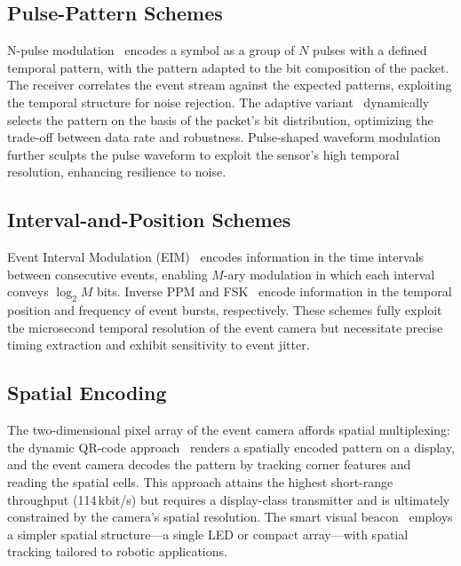 \documentclass[10pt,a4paper]{article}
\begin{document}
\subsection{Pulse-Pattern Schemes}
\label{sec:pulse}

N-pulse modulation~\cite{aranda2024npulse} encodes a symbol as a group
of $N$ pulses with a defined temporal pattern, with the pattern adapted
to the bit composition of the packet. The receiver correlates the event
stream against the expected patterns, exploiting the temporal structure
for noise rejection. The adaptive variant~\cite{nishar2025nlosneuromorphic}
dynamically selects the pattern on the basis of the packet's bit
distribution, optimizing the trade-off between data rate and robustness.
Pulse-shaped waveform modulation~\cite{aranda2025pulseshaped} further
sculpts the pulse waveform to exploit the sensor's high temporal
resolution, enhancing resilience to noise.

\subsection{Interval-and-Position Schemes}
\label{sec:interval}

Event Interval Modulation (EIM)~\cite{sumino2025eim} encodes information
in the time intervals between consecutive events, enabling $M$-ary
modulation in which each interval conveys $\log_2 M$ bits. Inverse PPM
\cite{shen2018eventocc} and FSK~\cite{shen2018eventocc} encode
information in the temporal position and frequency of event bursts,
respectively. These schemes fully exploit the microsecond temporal
resolution of the event camera but necessitate precise timing extraction
and exhibit sensitivity to event jitter.

\subsection{Spatial Encoding}
\label{sec:spatial}

The two-dimensional pixel array of the event camera affords spatial
multiplexing: the dynamic QR-code approach~\cite{su2025motionaware}
renders a spatially encoded pattern on a display, and the event camera
decodes the pattern by tracking corner features and reading the spatial
cells. This approach attains the highest short-range throughput
(114\,kbit/s) but requires a display-class transmitter and is ultimately
constrained by the camera's spatial resolution. The smart visual
beacon~\cite{wang2022beacon} employs a simpler spatial structure---a
single LED or compact array---with spatial tracking tailored to robotic
applications.
\end{document}
